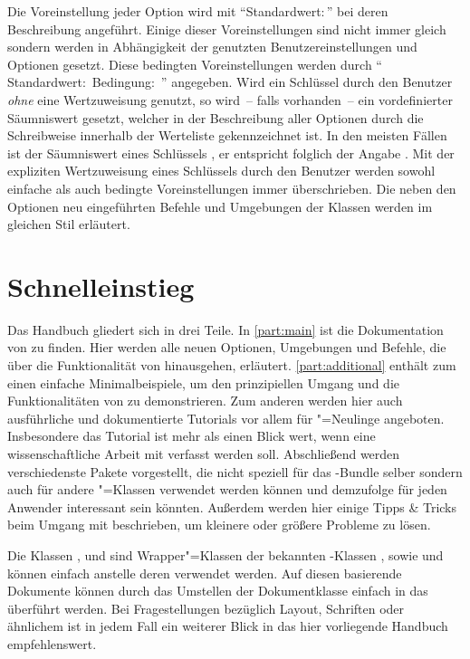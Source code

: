Die Voreinstellung jeder Option wird mit \enquote{Standardwert:\,} 
bei deren Beschreibung angeführt. Einige dieser Voreinstellungen sind nicht 
immer gleich sondern werden in Abhängigkeit der genutzten Benutzereinstellungen 
und Optionen gesetzt. Diese bedingten Voreinstellungen werden durch 
\enquote{%
  Standardwert:\,%
  \PValue{\,|\,}Bedingung:\,%
}
angegeben. Wird ein Schlüssel durch den Benutzer \emph{ohne} eine Wertzuweisung 
genutzt, so wird~-- falls vorhanden~-- ein vordefinierter Säumniswert gesetzt, 
welcher in der Beschreibung aller Optionen durch die~ 
Schreibweise innerhalb der Werteliste gekennzeichnet ist. In den meisten Fällen 
ist der Säumniswert eines Schlüssels , er entspricht folglich der 
Angabe . Mit der expliziten Wertzuweisung eines 
Schlüssels durch den Benutzer werden sowohl einfache als auch bedingte 
Voreinstellungen immer überschrieben. Die neben den Optionen neu eingeführten 
Befehle und Umgebungen der Klassen werden im gleichen Stil erläutert.



\section{Schnelleinstieg}
Das Handbuch gliedert sich in drei Teile. In \autoref{part:main} ist die 
Dokumentation von \TUDScript zu finden. Hier werden alle neuen Optionen, 
Umgebungen und Befehle, die über die Funktionalität von \KOMAScript{} 
hinausgehen, erläutert. \autoref{part:additional} enthält zum einen einfache 
Minimalbeispiele, um den prinzipiellen Umgang und die Funktionalitäten von 
\TUDScript zu demonstrieren. Zum anderen werden hier auch ausführliche und 
dokumentierte Tutorials vor allem für "=Neulinge angeboten. 
Insbesondere das Tutorial  ist mehr als einen Blick wert, 
wenn eine wissenschaftliche Arbeit mit  verfasst werden soll.
Abschließend werden verschiedenste Pakete vorgestellt, die nicht speziell für 
das \TUDScript-Bundle selber sondern auch für andere "=Klassen
verwendet werden können und demzufolge für jeden Anwender interessant sein 
könnten. Außerdem werden hier einige Tipps \& Tricks beim Umgang mit 
 beschrieben, um kleinere oder größere Probleme zu lösen.

Die Klassen ,  und  
sind Wrapper"=Klassen der bekannten \KOMAScript-Klassen , 
 sowie  und können einfach anstelle deren 
verwendet werden. Auf diesen basierende Dokumente können durch das Umstellen 
der Dokumentklasse einfach in das \TUDCD überführt werden. Bei Fragestellungen 
bezüglich Layout, Schriften oder ähnlichem ist in jedem Fall ein weiterer Blick
in das hier vorliegende Handbuch empfehlenswert.
